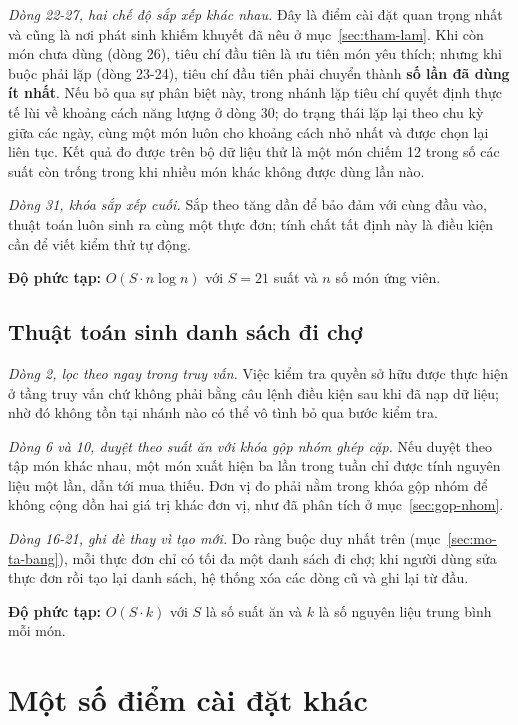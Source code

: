 \textit{Dòng 22-27, hai chế độ sắp xếp khác nhau.} Đây là điểm cài đặt quan
trọng nhất và cũng là nơi phát sinh khiếm khuyết đã nêu ở
mục~\ref{sec:tham-lam}. Khi còn món chưa dùng (dòng 26), tiêu chí đầu tiên là ưu
tiên món yêu thích; nhưng khi buộc phải lặp (dòng 23-24), tiêu chí đầu tiên phải
chuyển thành \textbf{số lần đã dùng ít nhất}. Nếu bỏ qua sự phân biệt này, trong
nhánh lặp tiêu chí quyết định thực tế lùi về khoảng cách năng lượng ở dòng 30;
do trạng thái  lặp lại theo chu kỳ giữa các ngày, cùng một món
luôn cho khoảng cách nhỏ nhất và được chọn lại liên tục. Kết quả đo được trên bộ
dữ liệu thử là một món chiếm 12 trong số các suất còn trống trong khi nhiều món
khác không được dùng lần nào.

\textit{Dòng 31, khóa sắp xếp cuối.} Sắp theo  tăng dần để bảo đảm với
cùng đầu vào, thuật toán luôn sinh ra cùng một thực đơn; tính chất tất định này
là điều kiện cần để viết kiểm thử tự động.

\noindent\textbf{Độ phức tạp:} $O(S \cdot n \log n)$ với $S = 21$ suất và $n$ số
món ứng viên.

\subsection{Thuật toán sinh danh sách đi chợ}
\label{sec:thuat-toan-di-cho}

\textit{Dòng 2, lọc theo  ngay trong truy vấn.} Việc kiểm tra quyền
sở hữu được thực hiện ở tầng truy vấn chứ không phải bằng câu lệnh điều kiện sau
khi đã nạp dữ liệu; nhờ đó không tồn tại nhánh nào có thể vô tình bỏ qua bước
kiểm tra.

\textit{Dòng 6 và 10, duyệt theo suất ăn với khóa gộp nhóm ghép cặp.} Nếu duyệt
theo tập món khác nhau, một món xuất hiện ba lần trong tuần chỉ được tính nguyên
liệu một lần, dẫn tới mua thiếu. Đơn vị đo phải nằm trong khóa gộp nhóm để không
cộng dồn hai giá trị khác đơn vị, như đã phân tích ở mục~\ref{sec:gop-nhom}.

\textit{Dòng 16-21, ghi đè thay vì tạo mới.} Do ràng buộc duy nhất trên
 (mục~\ref{sec:mo-ta-bang}), mỗi thực đơn chỉ có tối đa một danh
sách đi chợ; khi người dùng sửa thực đơn rồi tạo lại danh sách, hệ thống xóa các
dòng cũ và ghi lại từ đầu.

\noindent\textbf{Độ phức tạp:} $O(S \cdot k)$ với $S$ là số suất ăn và $k$ là số
nguyên liệu trung bình mỗi món.

\section{Một số điểm cài đặt khác}
\label{sec:cai-dat-khac}

